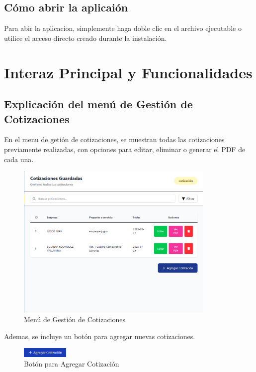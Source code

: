 \documentclass{Pretexto/bluereport}
\begin{document}
\subsection{Cómo abrir la aplicaión}

Para abir la aplicacion, simplemente haga doble clic en el archivo ejecutable o utilice el acceso directo creado durante la instalación.
\pagebreak
\section{Interaz Principal y Funcionalidades}
\subsection{Explicación del menú de Gestión de Cotizaciones}

En el menu de getión de cotizaciones, se muestran todas las cotizaciones previamente realizadas, con opciones para editar, eliminar o generar el PDF de cada una.

\begin{figure}[H]
    \centering
    \includegraphics[width=0.85\textwidth]{img/gestion_cotizaciones.png}
    \caption{Menú de Gestión de Cotizaciones}\label{fig:gestion_cotizaciones}
\end{figure}

Ademas, se incluye un botón para agregar nuevas cotizaciones.

\begin{figure}[H]
    \centering
    \includegraphics[width=0.2\textwidth]{img/agregar_cotizacion.png}
    \caption{Botón para Agregar Cotización}\label{fig:agregar_cotizacion}
\end{figure}
\end{document}
